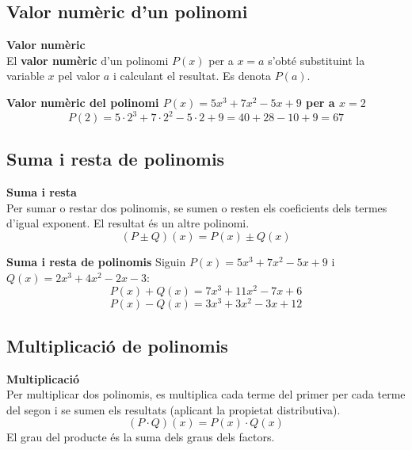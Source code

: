 \documentclass[12pt]{article}
\begin{document}
\subsection{Valor numèric d'un polinomi}

\begin{concept}
\textbf{Valor numèric}\\
El \textbf{valor numèric} d'un polinomi $P(x)$ per a $x = a$ s'obté substituint la variable $x$ pel valor $a$ i calculant el resultat. Es denota $P(a)$.
\end{concept}

\begin{exemple}
\textbf{Valor numèric del polinomi $P(x) = 5x^3+7x^2-5x+9$ per a $x=2$}
\[
P(2) = 5 \cdot 2^3 + 7 \cdot 2^2 - 5 \cdot 2 + 9 = 40 + 28 - 10 + 9 = 67
\]
\end{exemple}

\subsection{Suma i resta de polinomis}

\begin{concept}
\textbf{Suma i resta}\\
Per sumar o restar dos polinomis, se sumen o resten els coeficients dels termes d'igual exponent. El resultat és un altre polinomi.
\[
(P \pm Q)(x) = P(x) \pm Q(x)
\]
\end{concept}

\begin{exemple}
\textbf{Suma i resta de polinomis}
Siguin $P(x) = 5x^3+7x^2-5x+9$ i $Q(x) = 2x^3+4x^2-2x-3$:
\[
P(x) + Q(x) = 7x^3+11x^2-7x+6
\]
\[
P(x) - Q(x) = 3x^3+3x^2-3x+12
\]
\end{exemple}

\subsection{Multiplicació de polinomis}

\begin{concept}
\textbf{Multiplicació}\\
Per multiplicar dos polinomis, es multiplica cada terme del primer per cada terme del segon i se sumen els resultats (aplicant la propietat distributiva).
\[
(P \cdot Q)(x) = P(x) \cdot Q(x)
\]
El grau del producte és la suma dels graus dels factors.
\end{concept}
\end{document}
